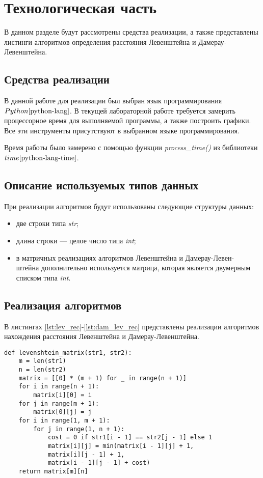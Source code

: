 \chapter{Технологическая часть}

В данном разделе будут рассмотрены средства реализации, а также представлены листинги алгоритмов определения расстояния Левенштейна и Дамерау-Левенштейна.

\section{Средства реализации}
В данной работе для реализации был выбран язык программирования $Python \cite{python-lang}$. В текущей лабораторной работе требуется замерить процессорное время для выполняемой программы, а также построить графики. Все эти инструменты присутствуют в выбранном языке программирования.

Время работы было замерено с помощью функции \textit{process\_time()} из библиотеки $time \cite{python-lang-time}$.


\section{Описание используемых типов данных}
При реализации алгоритмов будут использованы следующие структуры данных:

\begin{itemize}
	\item две строки типа \textit{str};
	\item длина строки --- целое число типа \textit{int};
	\item в матричных реализациях алгоритмов Левенштейна и Дамерау-Левен-\\штейна дополнительно используется матрица, которая является двумерным списком типа \textit{int}. 
\end{itemize}



\section{Реализация алгоритмов}

В листингах \ref{lst:lev_rec}-\ref{lst:dam_lev_rec} представлены реализации алгоритмов нахождения расстояния Левенштейна и Дамерау-Левенштейна.
\begin{center}
    \captionsetup{justification=raggedright,singlelinecheck=off}
    \begin{lstlisting}[label=lst:lev_rec,caption=Алгоритм нахождения расстояния Левенштейна (матричный)]
def levenshtein_matrix(str1, str2):
	m = len(str1)
	n = len(str2)
	matrix = [[0] * (m + 1) for _ in range(n + 1)]
	for i in range(n + 1):
		matrix[i][0] = i
	for j in range(m + 1):
		matrix[0][j] = j
	for i in range(1, m + 1):
		for j in range(1, n + 1):
			cost = 0 if str1[i - 1] == str2[j - 1] else 1
			matrix[i][j] = min(matrix[i - 1][j] + 1,         
			matrix[i][j - 1] + 1,         
			matrix[i - 1][j - 1] + cost)  
	return matrix[m][n]
\end{lstlisting}
\end{center}


